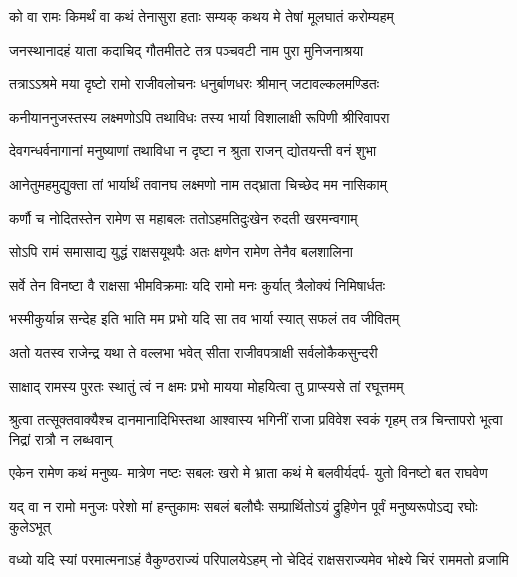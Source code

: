
\twolineshloka
{को वा रामः किमर्थं वा कथं तेनासुरा हताः}
{सम्यक् कथय मे तेषां मूलघातं करोम्यहम्} %


\twolineshloka
{जनस्थानादहं याता कदाचिद् गौतमीतटे}
{तत्र पञ्चवटी नाम पुरा मुनिजनाश्रया} %

\twolineshloka
{तत्राऽऽश्रमे मया दृष्टो रामो राजीवलोचनः}
{धनुर्बाणधरः श्रीमान् जटावल्कलमण्डितः} %

\twolineshloka
{कनीयाननुजस्तस्य लक्ष्मणोऽपि तथाविधः}
{तस्य भार्या विशालाक्षी रूपिणी श्रीरिवापरा} %

\twolineshloka
{देवगन्धर्वनागानां मनुष्याणां तथाविधा}
{न दृष्टा न श्रुता राजन् द्योतयन्ती वनं शुभा} %

\twolineshloka
{आनेतुमहमुद्युक्ता तां भार्यार्थं तवानघ}
{लक्ष्मणो नाम तद्भ्राता चिच्छेद मम नासिकाम्} %

\twolineshloka
{कर्णौ च नोदितस्तेन रामेण स महाबलः}
{ततोऽहमतिदुःखेन रुदती खरमन्वगाम्} %

\twolineshloka
{सोऽपि रामं समासाद्य युद्धं राक्षसयूथपैः}
{अतः क्षणेन रामेण तेनैव बलशालिना} %

\twolineshloka
{सर्वे तेन विनष्टा वै राक्षसा भीमविक्रमाः}
{यदि रामो मनः कुर्यात् त्रैलोक्यं निमिषार्धतः} %

\twolineshloka
{भस्मीकुर्यान्न सन्देह इति भाति मम प्रभो}
{यदि सा तव भार्या स्यात् सफलं तव जीवितम्} %

\twolineshloka
{अतो यतस्व राजेन्द्र यथा ते वल्लभा भवेत्}
{सीता राजीवपत्राक्षी सर्वलोकैकसुन्दरी} %

\twolineshloka
{साक्षाद् रामस्य पुरतः स्थातुं त्वं न क्षमः प्रभो}
{मायया मोहयित्वा तु प्राप्स्यसे तां रघूत्तमम्} %

\threelineshloka
{श्रुत्वा तत्सूक्तवाक्यैश्च दानमानादिभिस्तथा}
{आश्वास्य भगिनीं राजा प्रविवेश स्वकं गृहम्}
{तत्र चिन्तापरो भूत्वा निद्रां रात्रौ न लब्धवान्} %

\fourlineindentedshloka
{एकेन रामेण कथं मनुष्य-}
{मात्रेण नष्टः सबलः खरो मे}
{भ्राता कथं मे बलवीर्यदर्प-}
{युतो विनष्टो बत राघवेण} %

\fourlineindentedshloka
{यद् वा न रामो मनुजः परेशो}
{मां हन्तुकामः सबलं बलौघैः}
{सम्प्रार्थितोऽयं द्रुहिणेन पूर्वं}
{मनुष्यरूपोऽद्य रघोः कुलेऽभूत्} %

\fourlineindentedshloka
{वध्यो यदि स्यां परमात्मनाऽहं}
{वैकुण्ठराज्यं परिपालयेऽहम्}
{नो चेदिदं राक्षसराज्यमेव}
{भोक्ष्ये चिरं राममतो व्रजामि} %

